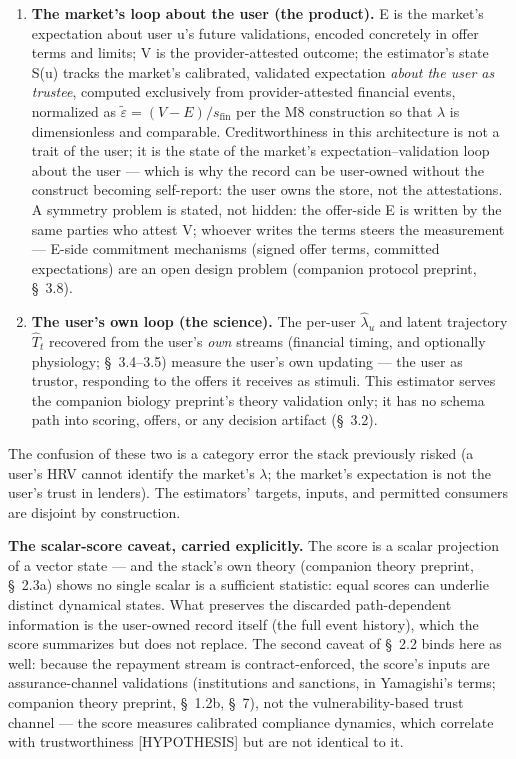\documentclass[
]{article}
\begin{document}
\begin{enumerate}
\def\labelenumi{\arabic{enumi}.}
\item
  \textbf{The market's loop about the user (the product).} E is the
  market's expectation about user u's future validations, encoded
  concretely in offer terms and limits; V is the provider-attested
  outcome; the estimator's state S(u) tracks the market's calibrated,
  validated expectation \emph{about the user as trustee}, computed
  exclusively from provider-attested financial events, normalized as
  \(\tilde{\varepsilon} = (V - E)/s_{\mathrm{fin}}\) per the M8
  construction so that \(\lambda\) is dimensionless and comparable.
  Creditworthiness in this architecture is not a trait of the user; it
  is the state of the market's expectation--validation loop about the
  user --- which is why the record can be user-owned without the
  construct becoming self-report: the user owns the store, not the
  attestations. A symmetry problem is stated, not hidden: the offer-side
  E is written by the same parties who attest V; whoever writes the
  terms steers the measurement --- E-side commitment mechanisms (signed
  offer terms, committed expectations) are an open design problem
  (companion protocol preprint, §~3.8).
\item
  \textbf{The user's own loop (the science).} The per-user
  \(\hat{\lambda}_u\) and latent trajectory \(\hat{T}_t\) recovered from
  the user's \emph{own} streams (financial timing, and optionally
  physiology; §~3.4--3.5) measure the user's own updating --- the user
  as trustor, responding to the offers it receives as stimuli. This
  estimator serves the companion biology preprint's theory validation
  only; it has no schema path into scoring, offers, or any decision
  artifact (§~3.2).
\end{enumerate}

The confusion of these two is a category error the stack previously
risked (a user's HRV cannot identify the market's \(\lambda\); the
market's expectation is not the user's trust in lenders). The
estimators' targets, inputs, and permitted consumers are disjoint by
construction.

\textbf{The scalar-score caveat, carried explicitly.} The score is a
scalar projection of a vector state --- and the stack's own theory
(companion theory preprint, §~2.3a) shows no single scalar is a
sufficient statistic: equal scores can underlie distinct dynamical
states. What preserves the discarded path-dependent information is the
user-owned record itself (the full event history), which the score
summarizes but does not replace. The second caveat of §~2.2 binds here
as well: because the repayment stream is contract-enforced, the score's
inputs are assurance-channel validations (institutions and sanctions, in
Yamagishi's terms; companion theory preprint, §~1.2b, §~7), not the
vulnerability-based trust channel --- the score measures calibrated
compliance dynamics, which correlate with trustworthiness
{[}HYPOTHESIS{]} but are not identical to it.
\end{document}

